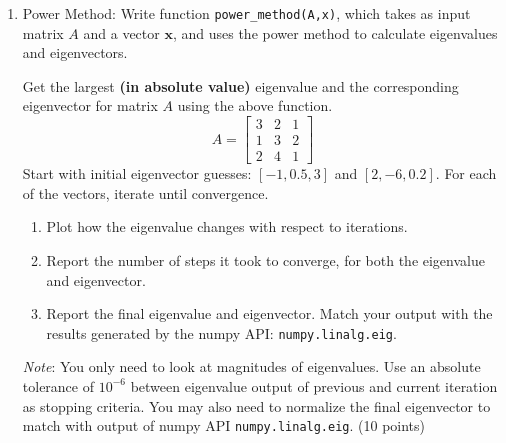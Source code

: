 \documentclass[11pt]{article}
\begin{document}
\begin{enumerate}
    \item[(a)] Power Method: Write function \texttt{power\_method(A,x)}, which takes as input matrix $A$ and a vector $\mathbf{x}$, and uses the power method to calculate eigenvalues and eigenvectors.

    Get the largest \textbf{(in absolute value)} eigenvalue and the corresponding eigenvector for matrix $A$ using the above function.
    $$
    A=\begin{bmatrix}
        3 & 2 & 1 \\
        1 & 3 & 2 \\
        2 & 4 & 1
    \end{bmatrix}
    $$
    Start with initial eigenvector guesses: $[-1, 0.5, 3]$ and $[2,-6,0.2]$. For each of the vectors, iterate until convergence.
    \begin{enumerate}
        \item[(i)] Plot how the eigenvalue changes with respect to iterations.
        \item[(ii)] Report the number of steps it took to converge, for both the eigenvalue and eigenvector.
        \item[(iii)] Report the final eigenvalue and eigenvector. Match your output with the results generated by the numpy API: \texttt{numpy.linalg.eig}.
    \end{enumerate}
    \emph{Note}: You only need to look at magnitudes of eigenvalues. Use an absolute tolerance of $10^{-6}$ between eigenvalue output of previous and current iteration as stopping criteria. You may also need to normalize the final eigenvector to match with output of numpy API \texttt{numpy.linalg.eig}. (10 points)


\end{enumerate}
\end{document}
